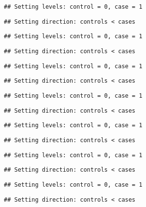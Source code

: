 \documentclass[
]{article}
\begin{document}
\begin{verbatim}
## Setting levels: control = 0, case = 1
\end{verbatim}

\begin{verbatim}
## Setting direction: controls < cases
\end{verbatim}

\begin{verbatim}
## Setting levels: control = 0, case = 1
\end{verbatim}

\begin{verbatim}
## Setting direction: controls < cases
\end{verbatim}

\begin{verbatim}
## Setting levels: control = 0, case = 1
\end{verbatim}

\begin{verbatim}
## Setting direction: controls < cases
\end{verbatim}

\begin{verbatim}
## Setting levels: control = 0, case = 1
\end{verbatim}

\begin{verbatim}
## Setting direction: controls < cases
\end{verbatim}

\begin{verbatim}
## Setting levels: control = 0, case = 1
\end{verbatim}

\begin{verbatim}
## Setting direction: controls < cases
\end{verbatim}

\begin{verbatim}
## Setting levels: control = 0, case = 1
\end{verbatim}

\begin{verbatim}
## Setting direction: controls < cases
\end{verbatim}

\begin{verbatim}
## Setting levels: control = 0, case = 1
\end{verbatim}

\begin{verbatim}
## Setting direction: controls < cases
\end{verbatim}
\end{document}
